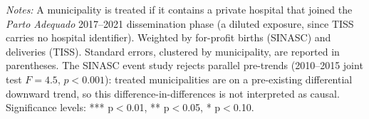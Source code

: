 
\begin{table}[H]
   \caption{\label{tab:parto_adequado} \textbf{\emph{Parto Adequado} difference-in-differences estimates}}
   \centering
\small\setlength{\tabcolsep}{5pt}
   
   \par \raggedright 
   \footnotesize\textit{Notes:} A municipality is treated if it contains a private hospital that joined the \emph{Parto Adequado} 2017--2021 dissemination phase (a diluted exposure, since TISS carries no hospital identifier). Weighted by for-profit births (SINASC) and deliveries (TISS). Standard errors, clustered by municipality, are reported in parentheses. The SINASC event study rejects parallel pre-trends (2010--2015 joint test $F=4.5$, $p<0.001$): treated municipalities are on a pre-existing differential downward trend, so this difference-in-differences is not interpreted as causal. \footnotesize Significance levels: *** p$<$0.01, ** p$<$0.05, * p$<$0.10.
\end{table}


